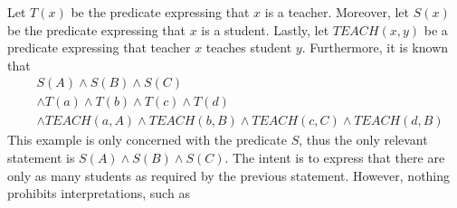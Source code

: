 \documentclass{article}
\begin{document}
Let $T(x)$ be the predicate expressing that $x$ is a teacher. Moreover, let $S(x)$ be the predicate expressing that $x$ is a student. Lastly, let $TEACH(x,y)$ be a predicate expressing that teacher $x$ teaches student $y$. Furthermore, it is known that
\begin{equation*}
\begin{split}
& S(A) \wedge S(B) \wedge S(C)  \\
& \wedge T(a) \wedge T(b) \wedge T(c) \wedge T(d) \\
& \wedge TEACH(a,A) \wedge TEACH(b,B) \wedge TEACH(c,C) \wedge TEACH(d,B)
\end{split}
\end{equation*}
This example is only concerned with the predicate $S$, thus the only relevant statement is $S(A) \wedge S(B) \wedge S(C)$. The intent is to express that there are only as many students as required by the previous statement. However, nothing prohibits interpretations, such as 
\end{document}
